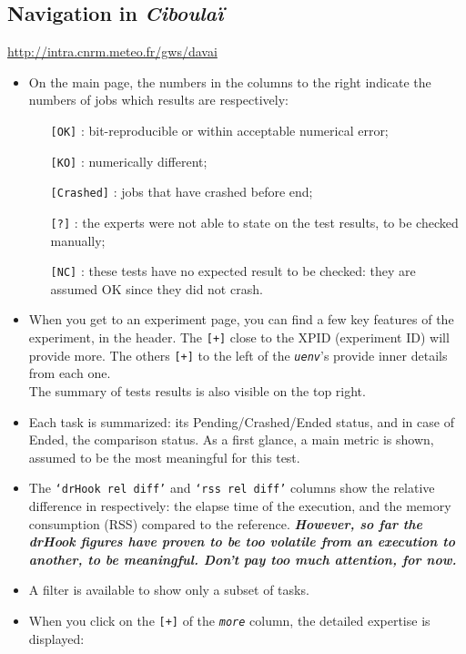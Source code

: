 \documentclass[a4paper,10pt,twoside]{article}
\begin{document}
 
 
\newpage
\subsection{Navigation in \textit{Ciboulaï}\label{sect:ciboulai_navigation}}
\href{http://intra.cnrm.meteo.fr/gws/davai}{http://intra.cnrm.meteo.fr/gws/davai}
\begin{itemize}
 \item On the main page, the numbers in the columns to the right indicate the numbers of jobs which results are respectively:
 \begin{itemize}
  \item[\texttt{[OK]}] : bit-reproducible or within acceptable numerical error;
  \item[\texttt{[KO]}] : numerically different;
  \item[\texttt{[Crashed]}] : jobs that have crashed before end;
  \item[\texttt{[?]}] : the experts were not able to state on the test results, to be checked manually;
  \item[\texttt{[NC]}] : these tests have no expected result to be checked: they are assumed OK since they did not crash.
 \end{itemize}
 \item When you get to an experiment page, you can find a few key features of the experiment, in the header. The \texttt{[+]} close to the XPID (experiment ID) will provide more. The others \texttt{[+]} to the left of the \textit{\texttt{uenv}}'s provide inner details from each one.\\
 The summary of tests results is also visible on the top right.
 \item Each task is summarized: its Pending/Crashed/Ended status, and in case of Ended, the comparison status. As a first glance, a main metric is shown, assumed to be the most meaningful for this test.
 \item The \texttt{`drHook rel diff'} and \texttt{`rss rel diff'} columns show the relative difference in respectively: the elapse time of the execution, and the memory consumption (RSS) compared to the reference. \textit{\textbf{However, so far the drHook figures have proven to be too volatile from an execution to another, to be meaningful. Don't pay too much attention, for now.}}
 \item A filter is available to show only a subset of tasks.
 \item When you click on the \texttt{[+]} of the \textit{\texttt{more}} column, the detailed expertise is displayed:

\end{itemize}
\end{document}
